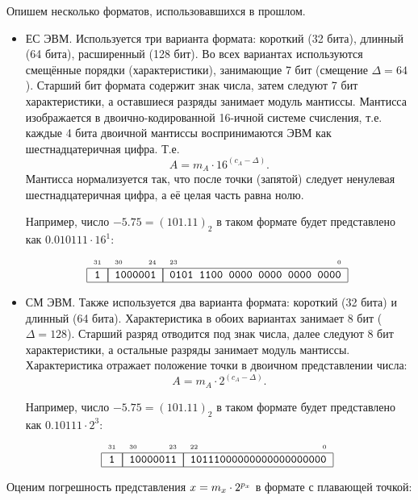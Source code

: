 Опишем несколько форматов, использовавшихся в прошлом.
\begin{itemize}
    \item ЕС ЭВМ. Используется три варианта формата: короткий (32 бита), длинный (64 бита), расширенный (128 бит). Во всех вариантах используются смещённые порядки (характеристики), занимающие 7 бит (смещение $\Delta = 64$). Старший бит формата содержит знак числа, затем следуют 7 бит характеристики, а оставшиеся разряды занимает модуль мантиссы. Мантисса изображается в двоично-кодированной 16-ичной системе счисления, т.е. каждые 4 бита двоичной мантиссы воспринимаются ЭВМ как шестнадцатеричная цифра. Т.е. \[A=m_A\cdot 16^{(c_A-\Delta)}.\] Мантисса нормализуется так, что после точки (запятой) следует ненулевая шестнадцатеричная цифра, а её целая часть равна нолю.
    
    Например, число $-5.75=(101.11)_2$ в таком формате будет представлено как $0.010111\cdot 16^{1}$:
    \[
        \FloatESShort{1}{1000001}{0101 1100 0000 0000 0000 0000}
    \]
    
    \item СМ ЭВМ. Также используется два варианта формата: короткий (32 бита) и длинный (64 бита). Характеристика в обоих вариантах занимает 8 бит ($\Delta = 128$). Старший разряд отводится под знак числа, далее следуют 8 бит характеристики, а остальные разряды занимает модуль мантиссы. Характеристика отражает положение точки в двоичном представлении числа:
    \[A=m_A\cdot 2^{(c_A-\Delta)}.\]
    
    Например, число $-5.75=(101.11)_2$ в таком формате будет представлено как $0.10111\cdot 2^{3}$:
    \[
        \FloatPCShort{1}{10000011}{10111000000000000000000}
    \]
\end{itemize}

Оценим погрешность представления $x = m_{x}\cdot {2}^{p_{x}}$ в формате с плавающей точкой:
    
